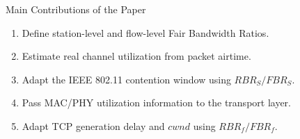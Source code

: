 

\begin{frame}{Main Contributions of the Paper}
\begin{enumerate}
\item Define station-level and flow-level Fair Bandwidth Ratios.
\item Estimate real channel utilization from packet airtime.
\item Adapt the IEEE 802.11 contention window using $RBR_S/FBR_S$.
\item Pass MAC/PHY utilization information to the transport layer.
\item Adapt TCP generation delay and $cwnd$ using $RBR_f/FBR_f$.
\end{enumerate}
\vspace{0.35cm}
\end{frame}
